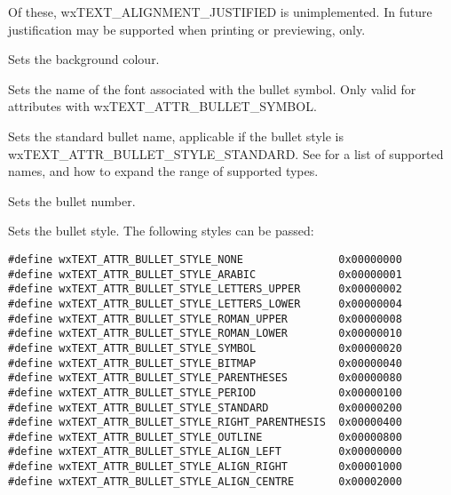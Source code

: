 Of these, wxTEXT\_ALIGNMENT\_JUSTIFIED is unimplemented. In future justification may be supported
when printing or previewing, only.

\label{wxrichtextattrsetbackgroundcolour}


Sets the background colour.

\label{wxrichtextattrsetbulletfont}


Sets the name of the font associated with the bullet symbol.
Only valid for attributes with wxTEXT\_ATTR\_BULLET\_SYMBOL.

\label{wxrichtextattrsetbulletname}


Sets the standard bullet name, applicable if the bullet style is wxTEXT\_ATTR\_BULLET\_STYLE\_STANDARD.
See  for a list
of supported names, and how to expand the range of supported types.

\label{wxrichtextattrsetbulletnumber}


Sets the bullet number.

\label{wxrichtextattrsetbulletstyle}


Sets the bullet style. The following styles can be passed:

{\small
\begin{verbatim}
#define wxTEXT_ATTR_BULLET_STYLE_NONE               0x00000000
#define wxTEXT_ATTR_BULLET_STYLE_ARABIC             0x00000001
#define wxTEXT_ATTR_BULLET_STYLE_LETTERS_UPPER      0x00000002
#define wxTEXT_ATTR_BULLET_STYLE_LETTERS_LOWER      0x00000004
#define wxTEXT_ATTR_BULLET_STYLE_ROMAN_UPPER        0x00000008
#define wxTEXT_ATTR_BULLET_STYLE_ROMAN_LOWER        0x00000010
#define wxTEXT_ATTR_BULLET_STYLE_SYMBOL             0x00000020
#define wxTEXT_ATTR_BULLET_STYLE_BITMAP             0x00000040
#define wxTEXT_ATTR_BULLET_STYLE_PARENTHESES        0x00000080
#define wxTEXT_ATTR_BULLET_STYLE_PERIOD             0x00000100
#define wxTEXT_ATTR_BULLET_STYLE_STANDARD           0x00000200
#define wxTEXT_ATTR_BULLET_STYLE_RIGHT_PARENTHESIS  0x00000400
#define wxTEXT_ATTR_BULLET_STYLE_OUTLINE            0x00000800
#define wxTEXT_ATTR_BULLET_STYLE_ALIGN_LEFT         0x00000000
#define wxTEXT_ATTR_BULLET_STYLE_ALIGN_RIGHT        0x00001000
#define wxTEXT_ATTR_BULLET_STYLE_ALIGN_CENTRE       0x00002000
\end{verbatim}
}

